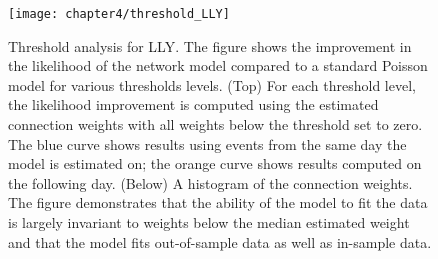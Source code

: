 
		\begin{figure}[p]
			\small
			\linespread{1}
			\centering
			\captionsetup{labelsep=colon, font=footnotesize, justification=centerfirst, width=\linewidth}
			\texttt{[image: chapter4/threshold\_LLY]}
			\captionsetup{skip=-20pt, position=below, font=footnotesize, justification=justified, width=\linewidth}
			\caption[Threshold analysis for LLY]{Threshold analysis for LLY. The figure shows the improvement in the likelihood of the network model compared to a standard Poisson model for various thresholds levels. (Top) For each threshold level, the likelihood improvement is computed using the estimated connection weights with all weights below the threshold set to zero. The blue curve shows results using events from the same day the model is estimated on; the orange curve shows results computed on the following day. (Below) A histogram of the connection weights. The figure demonstrates that the ability of the model to fit the data is largely invariant to weights below the median estimated weight and that the model fits out-of-sample data as well as in-sample data.}
			\label{fig:threshold_LLY}
		\end{figure}

